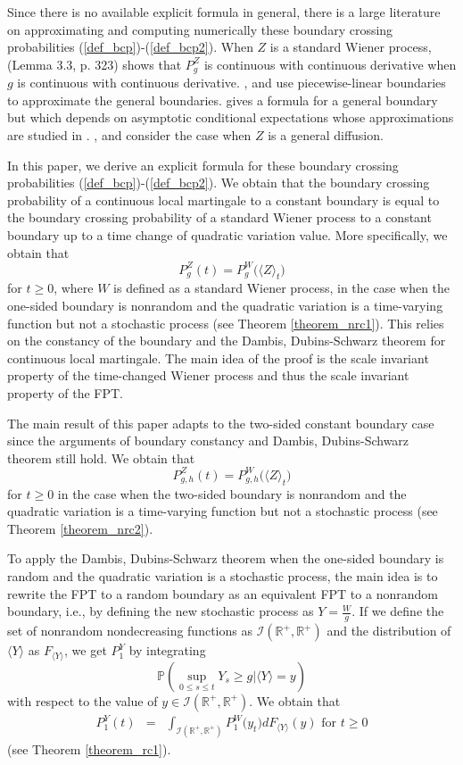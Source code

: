 \documentclass[aop]{imsart}
\theoremstyle{plain}
\theoremstyle{remark}
\newcommand{\reels}{\mathbb{R}}
\newcommand{\proba}{\mathbb{P}}
\begin{document}
Since there is no available explicit formula in general, there is a large literature on approximating and computing numerically these boundary crossing probabilities (\ref{def_bcp})-(\ref{def_bcp2}). When $Z$ is a standard Wiener process, \cite{strassen1967almost} (Lemma 3.3, p. 323) shows that $P_g^Z$ is continuous with continuous derivative when $g$ is continuous with continuous derivative. \cite{durbin1971boundary}, \cite{wang1997boundary} and \cite{novikov1999approximations} use piecewise-linear boundaries to approximate the general boundaries. \cite{durbin1985first} gives
a formula for a general boundary but which depends on asymptotic conditional expectations whose approximations are studied in
\cite{salminen1988first}. \cite{buonocore1987new}, \cite{giorno1989evaluation} and \cite{gutierrez1997first} consider the case when $Z$ is a general diffusion.

In this paper, we derive an explicit formula for these boundary crossing probabilities (\ref{def_bcp})-(\ref{def_bcp2}). We obtain that the boundary crossing probability of a continuous local martingale to a constant boundary is equal to the boundary crossing probability of a standard Wiener process to a constant boundary up to a time change of quadratic variation value. More specifically, we obtain that 
$$P_g^Z (t)  =  P_g^W \big(\langle Z\rangle_{t}\big)$$ 
for $t \geq 0$, where $W$ is defined as a standard Wiener process, in the case when the one-sided boundary is nonrandom and the quadratic variation is a time-varying function but not a stochastic process (see Theorem \ref{theorem_nrc1}). This relies on the constancy of the boundary and the Dambis, Dubins-Schwarz theorem for continuous local martingale. The main idea of the proof is the scale invariant property of the time-changed Wiener process and thus the scale invariant property of the FPT. 

The main result of this paper adapts to the two-sided constant boundary case since the arguments of boundary constancy and Dambis, Dubins-Schwarz theorem still hold. We obtain that 
$$P_{g,h}^Z (t)  =  P_{g,h}^W \big(\langle Z\rangle_{t}\big)$$ 
for $t \geq 0$ in the case when the two-sided boundary is nonrandom and the quadratic variation is a time-varying function but not a stochastic process (see Theorem \ref{theorem_nrc2}). 

To apply the Dambis, Dubins-Schwarz theorem when the one-sided boundary is random and the quadratic variation is a stochastic process, the main idea is to rewrite the FPT to a random boundary as an equivalent FPT to a nonrandom boundary, i.e., by defining the new stochastic process as $Y = \frac{W}{g}$. If we define the set of nonrandom nondecreasing functions as $\mathcal{I}(\reels^+,\reels^+)$ and the distribution of $\langle Y\rangle$ as $F_{\langle Y\rangle}$, we get $P_1^Y$ by integrating 
$$\proba (\sup_{0 \leq s \leq t} Y_s \geq g |\langle Y\rangle=y)$$ 
with respect to the value of $y \in \mathcal{I}(\reels^+,\reels^+)$. We obtain that
\begin{eqnarray*}
P_1^Y (t) & = & \int_{\mathcal{I}(\reels^+,\reels^+)} P_1^W \big(y_t\big) dF_{\langle Y\rangle}(y)\text{ for } t \geq 0
\end{eqnarray*}
(see Theorem \ref{theorem_rc1}).
\end{document}
